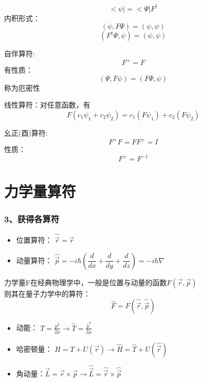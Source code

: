 \begin{frame} [allowframebreaks=]
\begin{definition}
        $$ <\psi| = <\Psi|F^{\dagger} $$
        内积形式：
        $$ (\psi,F\Psi)=(\psi,\psi)$$ 
        $$ (F^\dagger \Psi,\psi)=(\psi,\psi)$$ 
    \end{definition}   
    \begin{definition}
        自伴算符: 
        $$ F^{+} = F $$
        有性质：
        $$ (\Psi,F\psi)=(F\Psi,\psi)$$ 
        称为厄密性
    \end{definition} 
    \begin{definition}
        线性算符：对任意函数，有\\
        $$F(c_1\psi_1+c_2\psi_2 ) = c_1(F\psi_1)+c_2(F\psi_2 )$$
    \end{definition}
    \begin{definition}
        幺正(酉)算符: 
        $$ F^{+}F = FF^{+}=I $$
        性质：
        $$ F^{+}=F^{-1}$$ 
    \end{definition}         
\end{frame} 

\section{力学量算符}

\begin{frame} [allowframebreaks=]
    \frametitle{3、获得各算符}
    \begin{itemize}
        \item  位置算符： $ \hat{\vec{r}} =\vec{r} $
        \item  动量算符： $ \hat{\vec{p}} =-i\hbar(\dfrac{d}{d x}+ \dfrac{d}{d y} + \dfrac{d}{d z})=-i\hbar \nabla $
    \end{itemize}
    力学量F在经典物理学中，一般是位置与动量的函数$F(\vec{r},\vec{p})$\\
    则其在量子力学中的算符：$$ \hat{F}=F(\hat{\vec{r}},\hat{\vec{p}})$$
    \begin{exampleblock}{}
        \begin{itemize}
            \item  动能： $ T=\frac{p^2}{2\mu} \to \hat{T}= \frac{\hat{p}^2}{2\mu} $
            \item  哈密顿量： $ H=T+U(\vec{r} ) \to \hat{H}= \hat{T}+ U(\hat{\vec{r}})$
            \item  角动量：$ \vec{L}=\vec{r}\times\vec{p} \to \hat{\vec{L}}=\hat{\vec{r}}\times \hat{\vec{p}}$
        \end{itemize}
    \end{exampleblock}
\end{frame} 


